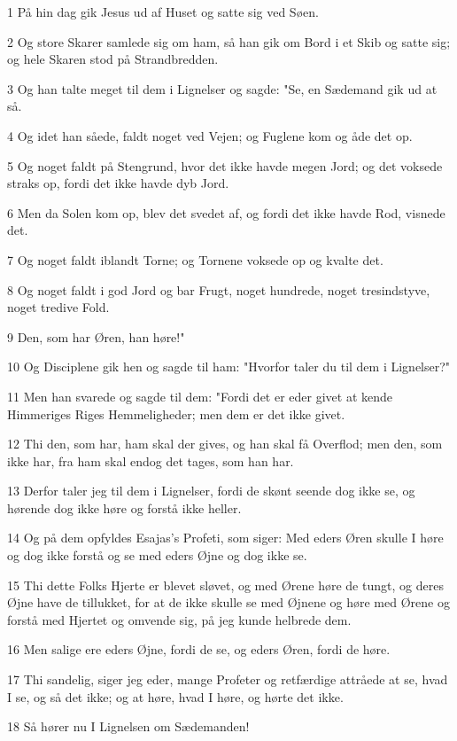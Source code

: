 \par 1 På hin dag gik Jesus ud af Huset og satte sig ved Søen.
\par 2 Og store Skarer samlede sig om ham, så han gik om Bord i et Skib og satte sig; og hele Skaren stod på Strandbredden.
\par 3 Og han talte meget til dem i Lignelser og sagde: "Se, en Sædemand gik ud at så.
\par 4 Og idet han såede, faldt noget ved Vejen; og Fuglene kom og åde det op.
\par 5 Og noget faldt på Stengrund, hvor det ikke havde megen Jord; og det voksede straks op, fordi det ikke havde dyb Jord.
\par 6 Men da Solen kom op, blev det svedet af, og fordi det ikke havde Rod, visnede det.
\par 7 Og noget faldt iblandt Torne; og Tornene voksede op og kvalte det.
\par 8 Og noget faldt i god Jord og bar Frugt, noget hundrede, noget tresindstyve, noget tredive Fold.
\par 9 Den, som har Øren, han høre!"
\par 10 Og Disciplene gik hen og sagde til ham: "Hvorfor taler du til dem i Lignelser?"
\par 11 Men han svarede og sagde til dem: "Fordi det er eder givet at kende Himmeriges Riges Hemmeligheder; men dem er det ikke givet.
\par 12 Thi den, som har, ham skal der gives, og han skal få Overflod; men den, som ikke har, fra ham skal endog det tages, som han har.
\par 13 Derfor taler jeg til dem i Lignelser, fordi de skønt seende dog ikke se, og hørende dog ikke høre og forstå ikke heller.
\par 14 Og på dem opfyldes Esajas's Profeti, som siger: Med eders Øren skulle I høre og dog ikke forstå og se med eders Øjne og dog ikke se.
\par 15 Thi dette Folks Hjerte er blevet sløvet, og med Ørene høre de tungt, og deres Øjne have de tillukket, for at de ikke skulle se med Øjnene og høre med Ørene og forstå med Hjertet og omvende sig, på jeg kunde helbrede dem.
\par 16 Men salige ere eders Øjne, fordi de se, og eders Øren, fordi de høre.
\par 17 Thi sandelig, siger jeg eder, mange Profeter og retfærdige attråede at se, hvad I se, og så det ikke; og at høre, hvad I høre, og hørte det ikke.
\par 18 Så hører nu I Lignelsen om Sædemanden!
